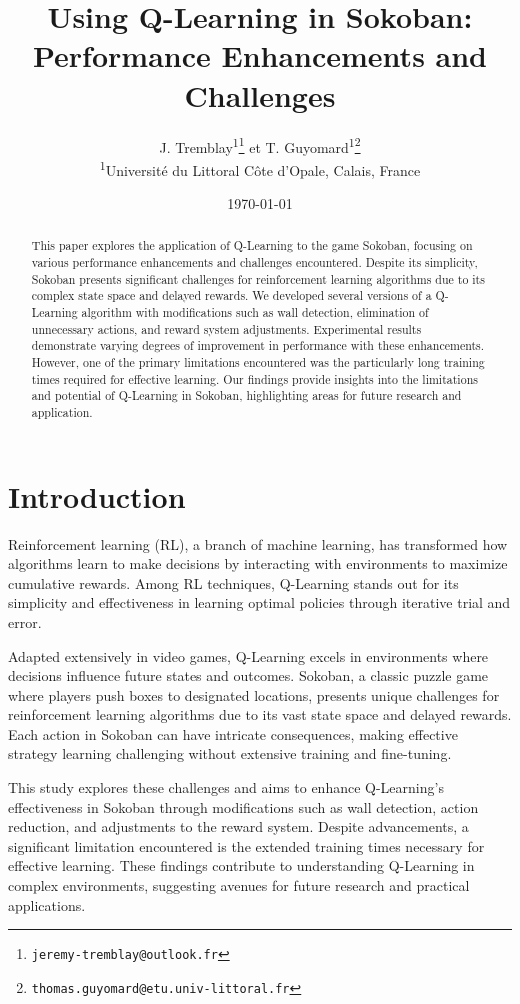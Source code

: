 \documentclass[10pt,twocolumn]{article}
\title{Using Q-Learning in Sokoban: Performance Enhancements and Challenges}
\author{
  J. Tremblay\textsuperscript{1}\thanks{\texttt{jeremy-tremblay@outlook.fr}}  
  \space et T. Guyomard\textsuperscript{1}\thanks{\texttt{thomas.guyomard@etu.univ-littoral.fr}} \\
  \textsuperscript{1}Université du Littoral Côte d'Opale, Calais, France
}
\date{\today}
\begin{document}
\maketitle

\begin{abstract}
    This paper explores the application of Q-Learning to the game Sokoban, focusing on various performance enhancements and challenges encountered. Despite its simplicity, Sokoban presents significant challenges for reinforcement learning algorithms due to its complex state space and delayed rewards. We developed several versions of a Q-Learning algorithm with modifications such as wall detection, elimination of unnecessary actions, and reward system adjustments. Experimental results demonstrate varying degrees of improvement in performance with these enhancements. However, one of the primary limitations encountered was the particularly long training times required for effective learning. Our findings provide insights into the limitations and potential of Q-Learning in Sokoban, highlighting areas for future research and application.
\end{abstract}

\section{Introduction}

Reinforcement learning (RL), a branch of machine learning, has transformed how algorithms learn to make decisions by interacting with environments to maximize cumulative rewards. Among RL techniques, Q-Learning stands out for its simplicity and effectiveness in learning optimal policies through iterative trial and error.

Adapted extensively in video games, Q-Learning excels in environments where decisions influence future states and outcomes. Sokoban, a classic puzzle game where players push boxes to designated locations, presents unique challenges for reinforcement learning algorithms due to its vast state space and delayed rewards. Each action in Sokoban can have intricate consequences, making effective strategy learning challenging without extensive training and fine-tuning.

This study explores these challenges and aims to enhance Q-Learning's effectiveness in Sokoban through modifications such as wall detection, action reduction, and adjustments to the reward system. Despite advancements, a significant limitation encountered is the extended training times necessary for effective learning. These findings contribute to understanding Q-Learning in complex environments, suggesting avenues for future research and practical applications.
\end{document}
